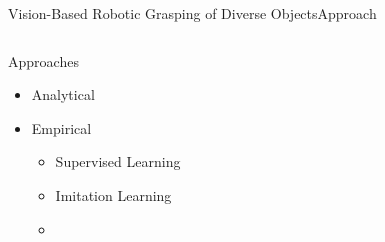 \begin{frame}{Vision-Based Robotic Grasping of Diverse Objects}{Approach}
    \begin{columns}%
        \begin{column}{0.375\textwidth}%
            \begin{block}{Approaches}
                \begin{itemize}
                    \item Analytical
                    \item Empirical
                    \begin{itemize}
                        \item Supervised Learning
                        \item Imitation Learning
                        \item {}
                    \end{itemize}
                \end{itemize}
            \end{block}
        \end{column}
        \begin{column}{0.625\textwidth}%
            \centering
        \end{column}
    \end{columns}
\end{frame}

